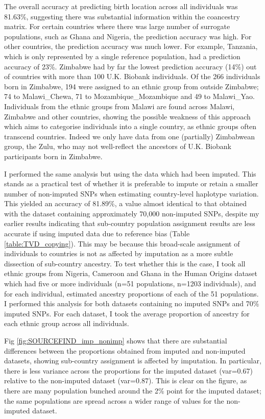The overall accuracy at predicting birth location across all individuals was 81.63\%, suggesting there was substantial information within the coancestry matrix. For certain countries where there was large number of surrogate populations, such as Ghana and Nigeria, the prediction accuracy was high. For other countries, the prediction accuracy was much lower. For example, Tanzania, which is only represented by a single reference population, had a prediction accuracy of 23\%. Zimbabwe had by far the lowest prediction accuracy (14\%) out of countries with more than 100 U.K. Biobank individuals. Of the 266 individuals born in Zimbabwe, 194 were assigned to an ethnic group from outside Zimbabwe; 74 to Malawi\_Chewa, 71 to Mozambique\_Mozambique and 49 to Malawi\_Yao. Individuals from the ethnic groups from Malawi are found across Malawi, Zimbabwe and other countries, showing the possible weakness of this approach which aims to categorise individuals into a single country, as ethnic groups often transcend countries. Indeed we only have data from one (partially) Zimbabwean group, the Zulu, who may not well-reflect the ancestors of U.K. Biobank participants born in Zimbabwe.

I performed the same analysis but using the data which had been imputed. This stands as a practical test of whether it is preferable to impute or retain a smaller number of non-imputed SNPs when estimating country-level haplotype variation. This yielded an accuracy of 81.89\%, a value almost identical to that obtained with the dataset containing approximately 70,000 non-imputed SNPs, despite my earlier results indicating that sub-country population assignment results are less accurate if using imputed data due to reference bias (Table \ref{table:TVD_copying}). This may be because this broad-scale assignment of individuals to countries is not as affected by imputation as a more subtle dissection of sub-country ancestry. To test whether this is the case, I took all ethnic groups from Nigeria, Cameroon and Ghana in the Human Origins dataset which had five or more individuals (n=51 populations, n=1203 individuals), and for each individual, estimated ancestry proportions of each of the 51 populations. I performed this analysis for both datasets containing no imputed SNPs and 70\% imputed SNPs. For each dataset, I took the average proportion of ancestry for each ethnic group across all individuals. 

Fig \ref{fig:SOURCEFIND_imp_nonimp} shows that there are substantial differences between the proportions obtained from imputed and non-imputed datasets, showing sub-country assignment is affected by imputation. In particular, there is less variance across the proportions for the imputed dataset (var=0.67) relative to the non-imputed dataset (var=0.87). This is clear on the figure, as there are many population bunched around the 2\% point for the imputed dataset; the same populations are spread across a wider range of values for the non-imputed dataset. 

